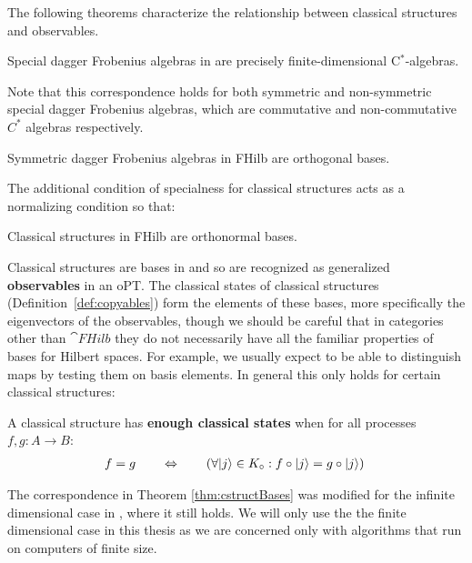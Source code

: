 The following theorems characterize the relationship between classical structures and observables. 

\begin{theorem}
Special dagger Frobenius algebras in  are precisely finite-dimensional C$^*$-algebras.
\end{theorem}
\noindent Note that this correspondence holds for both symmetric and non-symmetric special dagger Frobenius algebras, which are commutative and non-commutative $C^*$ algebras respectively.

\begin{theorem}
Symmetric dagger Frobenius algebras in FHilb are orthogonal bases.
\end{theorem}
\noindent The additional condition of specialness for classical structures acts as a normalizing condition so that:
\begin{theorem}
\label{thm:cstructBases}
Classical structures in FHilb are orthonormal bases.
\end{theorem}

\noindent \noindent Classical structures are bases in  and so are recognized as generalized \textbf{observables} in an oPT. The classical states of classical structures  (Definition~\ref{def:copyables}) form the elements of these bases, more specifically the eigenvectors of the observables, though we should be careful that in categories other than $\cat{FHilb}$ they do not necessarily have all the familiar properties of bases for Hilbert spaces.  For example, we usually expect to be able to distinguish maps by testing them on basis elements. In general this only holds for certain classical structures:

\begin{defn}
\label{def:enoughclassicalpoints}
A classical structure has \textbf{enough classical states} when for all processes $f,g:A\to B$: 
\begin{align}
f=g \qquad \Leftrightarrow \qquad \left(\forall | j \rangle\in K_{\circ}:f\circ| j \rangle=g\circ| j \rangle\right)\; 
\end{align}
\end{defn}

\begin{remark}
The correspondence in Theorem \ref{thm:cstructBases} was modified for the infinite dimensional case in \cite{abramsky2012h}, where it still holds. We will only use the the finite dimensional case in this thesis as we are concerned only with algorithms that run on computers of finite size.
\end{remark}

